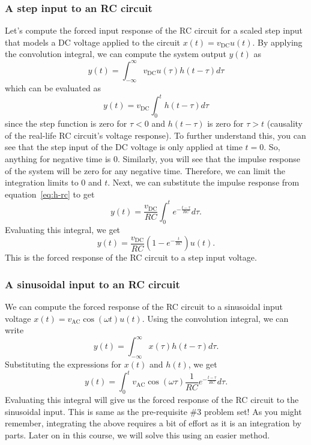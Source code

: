 \documentclass{ee102_notes}
\begin{document}
\subsubsection{A step input to an RC circuit}
Let's compute the forced input response of the RC circuit for a scaled step input that models a DC voltage applied to the circuit $x(t) = v_{\text{DC}} u(t)$. By applying the convolution integral, we can compute the system output $y(t)$ as 
\[
y(t) = \int_{-\infty}^{\infty} v_{\text{DC}} u(\tau) h(t - \tau) d\tau
\]
which can be evaluated as
\[
y(t) = v_{\text{DC}} \int_{0}^{t} h(t - \tau) d\tau
\]
since the step function is zero for $\tau < 0$ and $h(t - \tau)$ is zero for $\tau > t$ (causality of the real-life RC circuit's voltage response). To further understand this, you can see that the step input of the DC voltage is only applied at time $t = 0$. So, anything for negative time is 0. Similarly, you will see that the impulse response of the system will be zero for any negative time. Therefore, we can limit the integration limits to $0$ and $t$. Next, we can substitute the impulse response from equation~\eqref{eq:h-rc} to get
\[
y(t) = \frac{v_{\text{DC}}}{RC} \int_{0}^{t} e^{-\frac{t - \tau}{RC}} d\tau.
\]
Evaluating this integral, we get
\begin{equation}
    \label{eq:step-RC}
y(t) = \frac{v_{\text{DC}}}{RC} \left(1 - e^{-\frac{t}{RC}}\right)u(t).
\end{equation}
This is the forced response of the RC circuit to a step input voltage. 

\subsubsection{A sinusoidal input to an RC circuit}
We can compute the forced response of the RC circuit to a sinusoidal input voltage $x(t) = v_{\text{AC}} \cos(\omega t) u(t)$. Using the convolution integral, we can write
\[
y(t) = \int_{-\infty}^{\infty} x(\tau) h(t - \tau) d\tau.
\]
Substituting the expressions for $x(t)$ and $h(t)$, we get
\begin{equation}
    \label{eq:sine-RC}
y(t) = \int_{0}^{t} v_{\text{AC}} \cos(\omega \tau)\frac{1}{RC} e^{-\frac{t - \tau}{RC}} d\tau.
\end{equation}
Evaluating this integral will give us the forced response of the RC circuit to the sinusoidal input. This is same as the pre-requisite \#3 problem set! As you might remember, integrating the above requires a bit of effort as it is an integration by parts. Later on in this course, we will solve this using an easier method.
\end{document}

